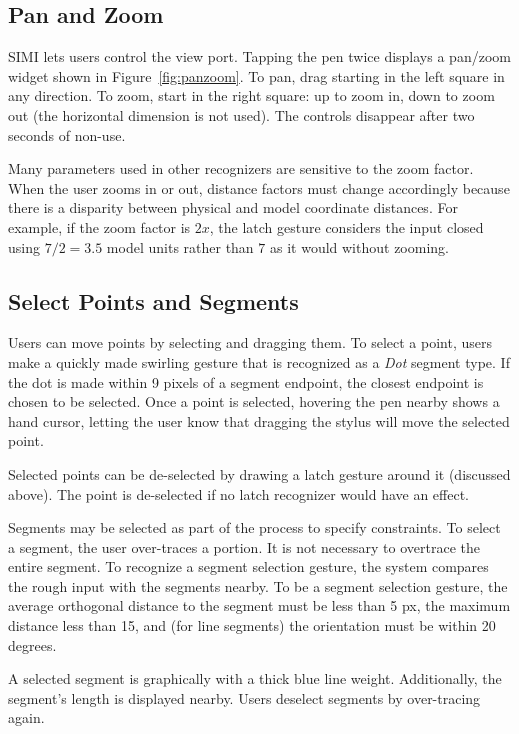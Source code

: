 \subsection{Pan and Zoom}

SIMI lets users control the view port. Tapping the pen twice displays
a pan/zoom widget shown in Figure~\ref{fig:panzoom}. To pan, drag
starting in the left square in any direction. To zoom, start in the
right square: up to zoom in, down to zoom out (the horizontal
dimension is not used). The controls disappear after two seconds of
non-use.

Many parameters used in other recognizers are sensitive to the zoom
factor. When the user zooms in or out, distance factors must change
accordingly because there is a disparity between physical and model
coordinate distances. For example, if the zoom factor is $2x$, the
latch gesture considers the input closed using $7/2=3.5$ model
units rather than $7$ as it would without zooming.



\subsection{Select Points and Segments}

Users can move points by selecting and dragging them. To select a
point, users make a quickly made swirling gesture that is recognized
as a \textit{Dot} segment type. If the dot is made within 9 pixels of
a segment endpoint, the closest endpoint is chosen to be
selected. Once a point is selected, hovering the pen nearby shows a
hand cursor, letting the user know that dragging the stylus will move
the selected point.

Selected points can be de-selected by drawing a latch gesture around it
(discussed above). The point is de-selected if no latch recognizer
would have an effect.

Segments may be selected as part of the process to specify  constraints. To select a segment, the user over-traces a
portion. It is not necessary to overtrace the entire segment. To
recognize a segment selection gesture, the system compares the rough
input with the segments nearby. To be a segment selection gesture, the
average orthogonal distance to the segment must be less than 5 px, the
maximum distance less than 15, and (for line segments) the orientation
must be within 20 degrees.

A selected segment is graphically with a thick blue line
weight. Additionally, the segment's length is displayed nearby. Users
deselect segments by over-tracing again.

